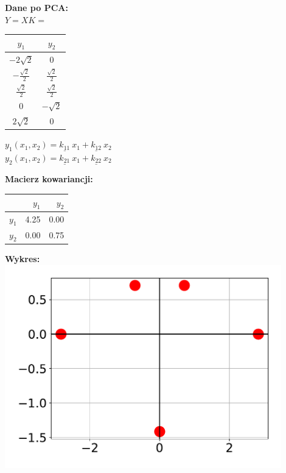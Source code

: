 \documentclass[a4paper,11pt]{article}
\newcommand{\myHeaderCellColor}{\cellcolor{black!10}}
\begin{document}
\noindent\begin{minipage}[t]{0.3\textwidth}
	\noindent\textbf{Dane po PCA:}\medskip\\
	$Y = XK =$
	\begin{tabular}{|c|c|}
		\hline
		$y_1$\myHeaderCellColor & $y_2$\myHeaderCellColor  \\\hline
        $-2\sqrt{2}$ & 0 \\\hline
        $-\tfrac{\sqrt{2}}{2}$ & $\tfrac{\sqrt{2}}{2}$ \\\hline
        $\tfrac{\sqrt{2}}{2} $ &  $\tfrac{\sqrt{2}}{2}$ \\\hline
        $0$ & $-\sqrt{2}$ \\\hline
        $2\sqrt{2}$ & 0 \\\hline
	\end{tabular}

	\bigskip
	\bigskip

    $y_1(x_1, x_2) = \underline{k_{11}}~x_1 + \underline{k_{12}}~x_2$\smallskip\\
    $y_2(x_1, x_2) = \underline{k_{21}}~x_1 + \underline{k_{22}}~x_2$

\end{minipage}
%
\begin{minipage}[t]{0.3\textwidth}
	\noindent\textbf{Macierz kowariancji:}\medskip\\
	\begin{tabular}{l|r|r|}
		\hhline{|~|-|-|}
		& $y_1$\myHeaderCellColor & $y_2$\myHeaderCellColor\\\hline
		\multicolumn{1}{|l|}{$y_1$\myHeaderCellColor} & 4.25 & 0.00 \\\hline
		\multicolumn{1}{|l|}{$y_2$\myHeaderCellColor} & 0.00 & 0.75 \\\hline
	\end{tabular}
\end{minipage}
%
\begin{minipage}[t]{0.45\textwidth}
	\noindent\textbf{Wykres:}\\\vspace{-0.1cm}
	\hspace{-0.85cm}\includegraphics[width=0.9\textwidth]{img/chart_pca_clear_y.pdf}
\end{minipage}
\end{document}
